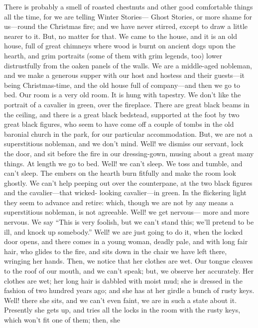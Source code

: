 There is probably a smell of roasted chestnuts and other good
comfortable things all the time, for we are telling Winter Stories---%
Ghost Stories, or more shame for us---round the Christmas fire; and
we have never stirred, except to draw a little nearer to it.  But,
no matter for that.  We came to the house, and it is an old house,
full of great chimneys where wood is burnt on ancient dogs upon the
hearth, and grim portraits (some of them with grim legends, too)
lower distrustfully from the oaken panels of the walls.  We are a
middle-aged nobleman, and we make a generous supper with our host
and hostess and their guests---it being Christmas-time, and the old
house full of company---and then we go to bed.  Our room is a very
old room.  It is hung with tapestry.  We don't like the portrait of
a cavalier in green, over the fireplace.  There are great black
beams in the ceiling, and there is a great black bedstead, supported
at the foot by two great black figures, who seem to have come off a
couple of tombs in the old baronial church in the park, for our
particular accommodation.  But, we are not a superstitious nobleman,
and we don't mind.  Well! we dismiss our servant, lock the door, and
sit before the fire in our dressing-gown, musing about a great many
things.  At length we go to bed.  Well! we can't sleep.  We toss and
tumble, and can't sleep.  The embers on the hearth burn fitfully and
make the room look ghostly.  We can't help peeping out over the
counterpane, at the two black figures and the cavalier---that wicked-%
looking cavalier---in green.  In the flickering light they seem to
advance and retire:  which, though we are not by any means a
superstitious nobleman, is not agreeable.  Well! we get nervous---%
more and more nervous.  We say ``This is very foolish, but we can't
stand this; we'll pretend to be ill, and knock up somebody.''  Well!
we are just going to do it, when the locked door opens, and there
comes in a young woman, deadly pale, and with long fair hair, who
glides to the fire, and sits down in the chair we have left there,
wringing her hands.  Then, we notice that her clothes are wet.  Our
tongue cleaves to the roof of our mouth, and we can't speak; but, we
observe her accurately.  Her clothes are wet; her long hair is
dabbled with moist mud; she is dressed in the fashion of two hundred
years ago; and she has at her girdle a bunch of rusty keys.  Well!
there she sits, and we can't even faint, we are in such a state
about it.  Presently she gets up, and tries all the locks in the
room with the rusty keys, which won't fit one of them; then, she
